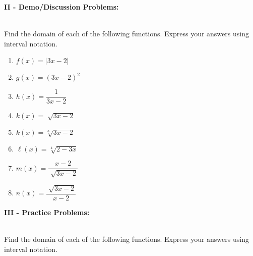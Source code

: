 \documentclass[12pt]{article}
\theoremstyle{definition}
\begin{document}
{\bf II - Demo/Discussion Problems:}\\
\ \par
Find the domain of each of the following functions.  Express your answers using interval notation.
\begin{multicols}{3}
\begin{enumerate}
\item $f (x) = |3x-2|$
\item $g (x) = (3x-2)^2$
\item $h(x) = \dfrac{1}{3x-2}$
\item $k (x) = \sqrt[]{3x-2}$
\item $k (x) = \sqrt[3]{3x-2}$
\item $\ell (x) = \sqrt[4]{2-3x}$
\item $m(x) = \dfrac{x-2}{\sqrt[]{3x-2}}$
\item $n(x) = \dfrac{\sqrt[]{3x-2}}{x-2}$
\end{enumerate}
\end{multicols}
\newpage
{\bf III - Practice Problems:}\\
\ \par
Find the domain of each of the following functions.  Express your answers using interval notation.
\end{document}
